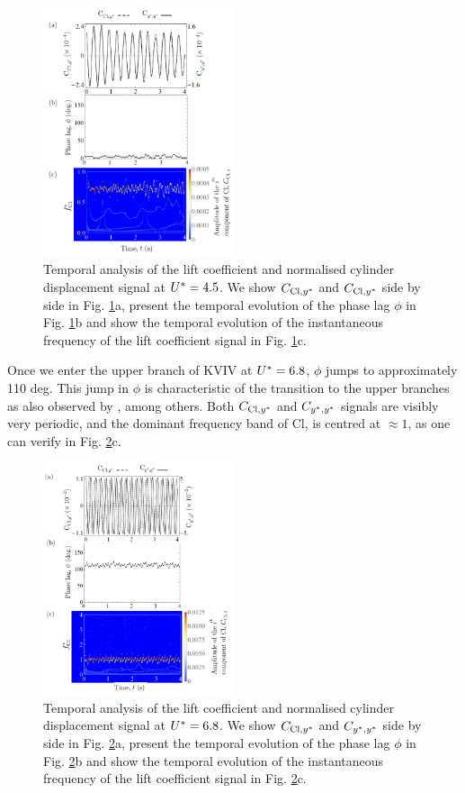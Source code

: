 \documentclass[a4paper,fleqn]{cas-sc}
\begin{document}
\begin{figure}
  \centering
  \includegraphics[width=0.5\textwidth]{figs/figure12}
  \caption{Temporal analysis of the lift coefficient and normalised cylinder displacement signal at $U^{*} = 4.5$. We show $C_{\text{Cl},y^{*}}$ and $C_{\text{Cl},y^{*}}$ side by side in Fig. \ref{fig:tempAnalysisKVIV}a, present the temporal evolution of the phase lag $\phi$ in Fig. \ref{fig:tempAnalysisKVIV}b and show the temporal evolution of the instantaneous frequency of the lift coefficient signal in Fig. \ref{fig:tempAnalysisKVIV}c.} \label{fig:tempAnalysisKVIV}
\end{figure}

Once we enter the upper branch of KVIV at  $U^{*} = 6.8$, $\phi$ jumps to approximately 110 deg. This jump in $\phi$ is characteristic of the transition to the upper branches as also observed by \citet{Maruai2018}, among others. Both $C_{\text{Cl},y^{*}}$ and $C_{y^{*},y^{*}}$ signals are visibly very periodic, and the dominant frequency band of Cl, is centred at $\approx 1$, as one can verify in Fig. \ref{fig:tempAnalysisUpper}c.

\begin{figure}
  \centering
  \includegraphics[width=0.5\textwidth]{figs/figure13}
  \caption{Temporal analysis of the lift coefficient and normalised cylinder displacement signal at $U^{*} = 6.8$. We show $C_{\text{Cl},y^{*}}$ and $C_{y^{*},y^{*}}$ side by side in Fig. \ref{fig:tempAnalysisUpper}a, present the temporal evolution of the phase lag $\phi$ in Fig. \ref{fig:tempAnalysisUpper}b and show the temporal evolution of the instantaneous frequency of the lift coefficient signal in Fig. \ref{fig:tempAnalysisUpper}c.} \label{fig:tempAnalysisUpper}
\end{figure}
\end{document}
